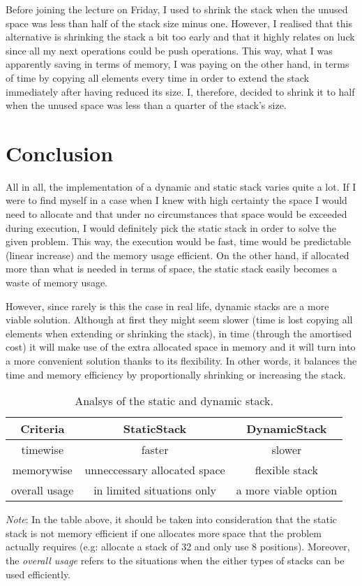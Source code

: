 \documentclass[a4paper,11pt]{article}
\begin{document}
Before joining the lecture on Friday, I used to shrink the stack when the unused space was less than half of the stack size minus one.
However, I realised that this alternative is shrinking the stack a bit too early and that it highly relates on luck since all my next operations could 
be push operations. This way, what I was apparently saving in terms of memory, 
I was paying on the other hand, in terms of time by copying all elements every time in order to extend the stack immediately after having reduced its size. I, therefore, decided to shrink
it to half when the unused space was less than a quarter of the stack's
size. 


\section*{Conclusion}

All in all, the implementation of a dynamic and static stack varies quite a lot. If I were to find myself in a case when I knew with high certainty
the space I would need to allocate and that under no circumstances that space would be exceeded during execution, 
I would definitely pick the static stack in order to solve the given problem. 
This way, the execution would be fast, time would be predictable (linear increase) and the memory usage efficient. On the other hand, 
if allocated more than what is needed in terms of space, the static stack easily becomes a waste of memory usage. \newline

However, since rarely is this the case in real life, dynamic stacks are a more viable solution. 
Although at first they might seem slower (time is lost copying all elements when extending or shrinking the stack),
in time (through the amortised cost) it will make use of the extra allocated space in memory and it will turn into a more convenient solution thanks to its flexibility.
In other words, it balances the time and memory efficiency by proportionally shrinking or increasing the stack. \newline

\begin{table}[h!]
  \centering
     \begin{tabular}{||c c c||} 
     \hline
      Criteria & StaticStack & DynamicStack \\ [0.5ex] 
     \hline\hline
     timewise & faster & slower  \\ 
     memorywise & unneccessary allocated space & flexible stack\\
     overall usage & in limited situations only & a more viable option \\ [1ex] 
     \hline
     \end{tabular}
     \caption{Analsys of the static and dynamic stack.}
     \label{table:2}
    \end{table}

\textit{Note}: In the table above, it should be taken into consideration that the static stack is not memory efficient if one allocates more space that the 
problem actually requires (e.g: allocate a stack of 32 and only use 8 positions). Moreover, the \textit{overall usage} refers to the situations when 
the either types of stacks can be used efficiently. 
\end{document}
